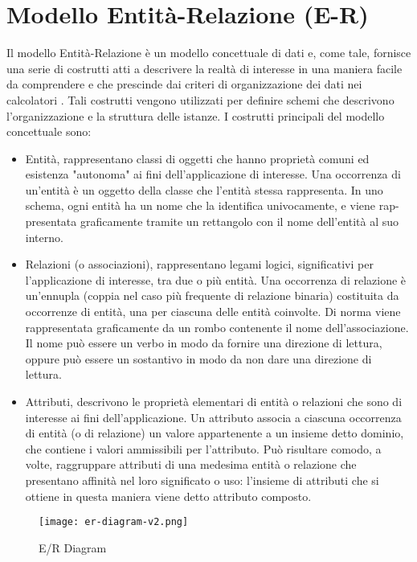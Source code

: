 
\newpage

\section{Modello Entità-Relazione (E-R)}

Il modello Entità-Relazione è un modello concettuale di dati e, come tale, fornisce una serie di costrutti atti a descrivere la realtà di interesse in una maniera facile da comprendere e che prescinde dai criteri di organizzazione dei dati nei calcolatori \cite{basidati}. Tali costrutti vengono utilizzati per definire schemi che descrivono l'organizzazione e la struttura delle istanze.
I costrutti principali del modello concettuale sono:
\begin{itemize}
    \item Entità, rappresentano classi di oggetti che hanno proprietà comuni ed esistenza "autonoma" ai fini dell’applicazione di interesse. Una occorrenza di un'entità è un oggetto della classe che l'entità stessa rappresenta. In uno schema, ogni entità ha un nome che la identifica univocamente, e viene rap-presentata graficamente tramite un rettangolo con il nome dell'entità al suo interno.
    \item Relazioni (o associazioni), rappresentano legami logici, significativi per l'applicazione di interesse, tra due o più entità. Una occorrenza di relazione è un'ennupla (coppia nel caso più frequente di relazione binaria) costituita da occorrenze di entità, una per ciascuna delle entità coinvolte. Di norma viene rappresentata graficamente da un rombo contenente il nome dell'associazione. Il nome può essere un verbo in modo da fornire una direzione di lettura, oppure può essere un sostantivo in modo da non dare una direzione di lettura.
    \item Attributi, descrivono le proprietà elementari di entità o relazioni che sono di interesse ai fini dell'applicazione. Un attributo associa a ciascuna occorrenza di entità (o di relazione) un valore appartenente a un insieme detto dominio, che contiene i valori ammissibili per l’attributo. Può risultare comodo, a volte, raggruppare attributi di una medesima entità o relazione che presentano affinità nel loro significato o uso: l’insieme di attributi che si ottiene in questa maniera viene detto attributo composto.
\end{itemize}

\begin{figure}[H]
    \centering
    \texttt{[image: er-diagram-v2.png]}
    \caption{E/R Diagram}
    \label{fig:ErDiagram}
\end{figure}

